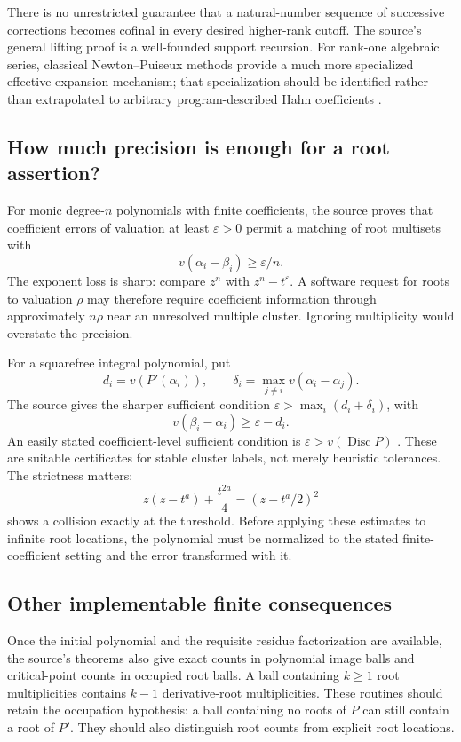 \documentclass[11pt,letterpaper]{article}
\numberwithin{equation}{section}
\theoremstyle{definition}
\theoremstyle{remark}\newtheorem{remark}[theorem]{Remark}
\newcommand{\Disc}{\operatorname{Disc}}
\begin{document}
There is no unrestricted guarantee that a natural-number sequence of
successive corrections becomes cofinal in every desired higher-rank cutoff.
The source's general lifting proof is a well-founded support recursion. For
rank-one algebraic series, classical Newton--Puiseux methods provide a much
more specialized effective expansion mechanism; that specialization should
be identified rather than extrapolated to arbitrary program-described Hahn
coefficients \cite{Poonen,SourcePolynomial}.

\subsection{How much precision is enough for a root assertion?}
For monic degree-$n$ polynomials with finite coefficients, the source proves
that coefficient errors of valuation at least $\varepsilon>0$ permit a
matching of root multisets with
\begin{equation}\label{eq:rootmatch}
 v(\alpha_i-\beta_i)\ge\varepsilon/n.
\end{equation}
The exponent loss is sharp: compare $z^n$ with $z^n-t^\varepsilon$.
A software request for roots to valuation $\rho$ may therefore require
coefficient information through approximately $n\rho$ near an unresolved
multiple cluster. Ignoring multiplicity would overstate the precision.

For a squarefree integral polynomial, put
\[
 d_i=v(P'(\alpha_i)),\qquad
 \delta_i=\max_{j\ne i}v(\alpha_i-\alpha_j).
\]
The source gives the sharper sufficient condition
$\varepsilon>\max_i(d_i+\delta_i)$, with
\[
 v(\beta_i-\alpha_i)\ge\varepsilon-d_i.
\]
An easily stated coefficient-level sufficient condition is
$\varepsilon>v(\Disc P)$ \cite{SourcePolynomial}. These are suitable
certificates for stable cluster labels, not merely heuristic tolerances.
The strictness matters:
\[
 z(z-t^a)+\frac{t^{2a}}4=(z-t^a/2)^2
\]
shows a collision exactly at the threshold. Before applying these estimates
to infinite root locations, the polynomial must be normalized to the stated
finite-coefficient setting and the error transformed with it.

\subsection{Other implementable finite consequences}
Once the initial polynomial and the requisite residue factorization are
available, the source's theorems also give exact counts in polynomial image
balls and critical-point counts in occupied root balls. A ball containing
$k\ge1$ root multiplicities contains $k-1$ derivative-root multiplicities.
These routines should retain the occupation hypothesis: a ball containing no
roots of $P$ can still contain a root of $P'$. They should also distinguish
root counts from explicit root locations.
\end{document}
